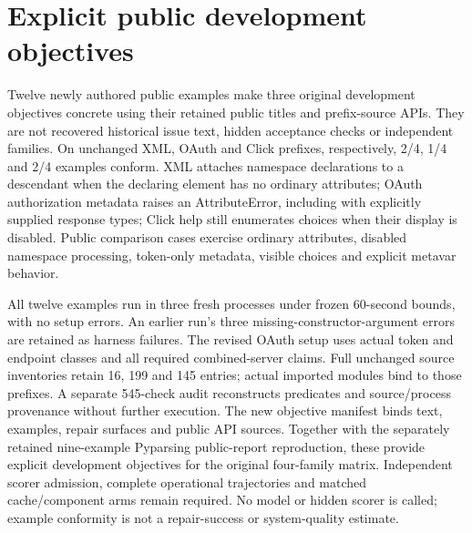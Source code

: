 \section{Explicit public development objectives}
Twelve newly authored public examples make three original development objectives
concrete using their retained public titles and prefix-source APIs. They are not
recovered historical issue text, hidden acceptance checks or independent families.
On unchanged XML, OAuth and Click prefixes, respectively, 2/4, 1/4 and 2/4
examples conform. XML attaches namespace declarations to a descendant when the
declaring element has no ordinary attributes; OAuth authorization metadata raises
an AttributeError, including with explicitly supplied response types; Click help
still enumerates choices when their display is disabled. Public comparison cases
exercise ordinary attributes, disabled namespace processing, token-only metadata,
visible choices and explicit metavar behavior.

All twelve examples run in three fresh processes under frozen 60-second bounds,
with no setup errors. An earlier run's three missing-constructor-argument errors
are retained as harness failures. The revised OAuth setup uses actual token and
endpoint classes and all required combined-server claims. Full unchanged source
inventories retain 16, 199 and 145 entries; actual imported modules bind to those
prefixes. A separate 545-check audit reconstructs predicates and source/process
provenance without further execution. The new objective manifest binds text,
examples, repair surfaces and public API sources. Together with the separately
retained nine-example Pyparsing public-report reproduction, these provide explicit
development objectives for the original four-family matrix. Independent scorer
admission, complete operational trajectories and matched cache/component arms
remain required. No model or hidden scorer is called; example conformity is not
a repair-success or system-quality estimate.

